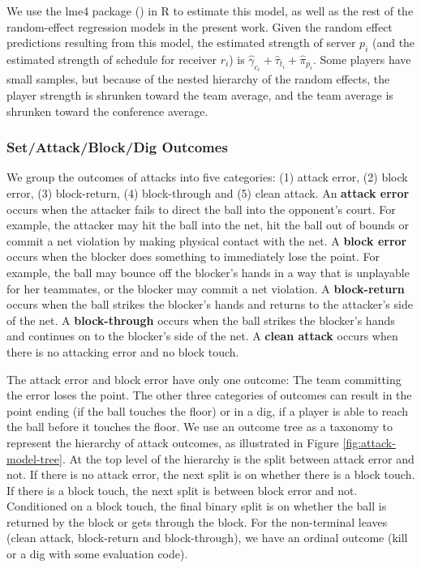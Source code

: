 \documentclass[USenglish]{article}
\theoremstyle{dgthm}
\theoremstyle{dgdef}
\begin{document}
We use the lme4 package (\cite{bates_etal_2015}) in R to estimate this model, as well as the rest of the random-effect regression models in the present work. Given the random effect predictions resulting from this model, the estimated strength of server $p_i$ (and the estimated strength of schedule for receiver $r_i$) is $\hat\gamma_{c_i} + \hat\tau_{t_i} + \hat\pi_{p_i}$. Some players have small samples, but because of the nested hierarchy of the random effects, the player strength is shrunken toward the team average, and the team average is shrunken toward the conference average.

\subsubsection{Set/Attack/Block/Dig Outcomes}
\label{sec:sos-attack}

We group the outcomes of attacks into five categories: (1) attack error, (2) block error, (3) block-return, (4) block-through and (5) clean attack. An {\bf attack error} occurs when the attacker fails to direct the ball into the opponent's court. For example, the attacker may hit the ball into the net, hit the ball out of bounds or commit a net violation by making physical contact with the net. A {\bf block error} occurs when the blocker does something to immediately lose the point. For example, the ball may bounce off the blocker's hands in a way that is unplayable for her teammates, or the blocker may commit a net violation. A {\bf block-return} occurs when the ball strikes the blocker's hands and returns to the attacker's side of the net. A {\bf block-through} occurs when the ball strikes the blocker's hands and continues on to the blocker's side of the net. A {\bf clean attack} occurs when there is no attacking error and no block touch.

The attack error and block error have only one outcome: The team committing the error loses the point. The other three categories of outcomes can result in the point ending (if the ball touches the floor) or in a dig, if a player is able to reach the ball before it touches the floor. We use an outcome tree as a taxonomy to represent the hierarchy of attack outcomes, as illustrated in Figure \ref{fig:attack-model-tree}. At the top level of the hierarchy is the split between attack error and not. If there is no attack error, the next split is on whether there is a block touch. If there is a block touch, the next split is between block error and not. Conditioned on a block touch, the final binary split is on whether the ball is returned by the block or gets through the block. For the non-terminal leaves (clean attack, block-return and block-through), we have an ordinal outcome (kill or a dig with some evaluation code).
\end{document}

